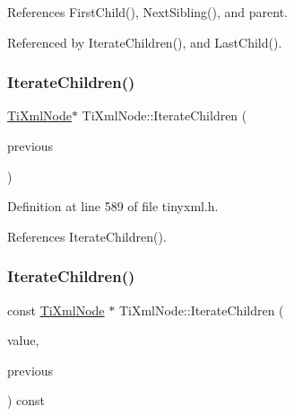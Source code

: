 References First\+Child(), Next\+Sibling(), and parent.



Referenced by Iterate\+Children(), and Last\+Child().

\hypertarget{class_ti_xml_node_a2358e747118fdbf0e467b1e4f7d03de1}{}\label{class_ti_xml_node_a2358e747118fdbf0e467b1e4f7d03de1} 
\subsubsection{\texorpdfstring{Iterate\+Children()}{IterateChildren()}\hspace{0.1cm}{\footnotesize\ttfamily [2/6]}}
{\footnotesize\ttfamily \hyperlink{class_ti_xml_node}{Ti\+Xml\+Node}$\ast$ Ti\+Xml\+Node\+::\+Iterate\+Children (\begin{DoxyParamCaption}\item[{const \hyperlink{class_ti_xml_node}{Ti\+Xml\+Node} $\ast$}]{previous }\end{DoxyParamCaption})\hspace{0.3cm}{\ttfamily [inline]}}



Definition at line 589 of file tinyxml.\+h.



References Iterate\+Children().

\hypertarget{class_ti_xml_node_a74bc68a536c279a42af346cb1454f143}{}\label{class_ti_xml_node_a74bc68a536c279a42af346cb1454f143} 
\subsubsection{\texorpdfstring{Iterate\+Children()}{IterateChildren()}\hspace{0.1cm}{\footnotesize\ttfamily [3/6]}}
{\footnotesize\ttfamily const \hyperlink{class_ti_xml_node}{Ti\+Xml\+Node} $\ast$ Ti\+Xml\+Node\+::\+Iterate\+Children (\begin{DoxyParamCaption}\item[{const char $\ast$}]{value,  }\item[{const \hyperlink{class_ti_xml_node}{Ti\+Xml\+Node} $\ast$}]{previous }\end{DoxyParamCaption}) const}



